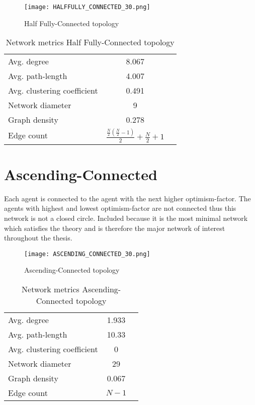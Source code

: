 \documentclass[Bachelorarbeit.tex]{subfiles}
\begin{document}
\begin{figure}[H]
	\centering
  \texttt{[image: HALFFULLY\_CONNECTED\_30.png]}
	\caption{Half Fully-Connected topology}
	\label{fig:topology_HALFFULLY_CONNECTED_30}
\end{figure}

\begin{table}[h]
	\centering
	\caption{Network metrics Half Fully-Connected topology}
	\begin{tabular} { l c r }
		\hline
		Avg. degree & 8.067 \\
		Avg. path-length & 4.007 \\
		Avg. clustering coefficient & 0.491 \\
		Network diameter & 9 \\
		Graph density & 0.278 \\
		Edge count & $\frac{\frac{N}{2}(\frac{N}{2} - 1)}{2} + \frac{N}{2} + 1$ \\
		\hline
	\end{tabular}
\end{table}

\section{Ascending-Connected}
Each agent is connected to the agent with the next higher optimism-factor. The agents with highest and lowest optimism-factor are not connected thus this network is not a closed circle.
\medskip
Included because it is the most minimal network which satisfies the theory and is therefore the major network of interest throughout the thesis.

\begin{figure}[H]
	\centering
  \texttt{[image: ASCENDING\_CONNECTED\_30.png]}
	\caption{Ascending-Connected topology}
	\label{fig:topology_ASCENDING_CONNECTED_30}
\end{figure}

\begin{table}[h]
	\centering
	\caption{Network metrics Ascending-Connected topology}
	\begin{tabular} { l c r }
		\hline
		Avg. degree & 1.933 \\
		Avg. path-length & 10.33 \\
		Avg. clustering coefficient & 0 \\
		Network diameter & 29 \\
		Graph density & 0.067 \\
		Edge count & $N-1$ \\
		\hline
	\end{tabular}
\end{table}
\end{document}
